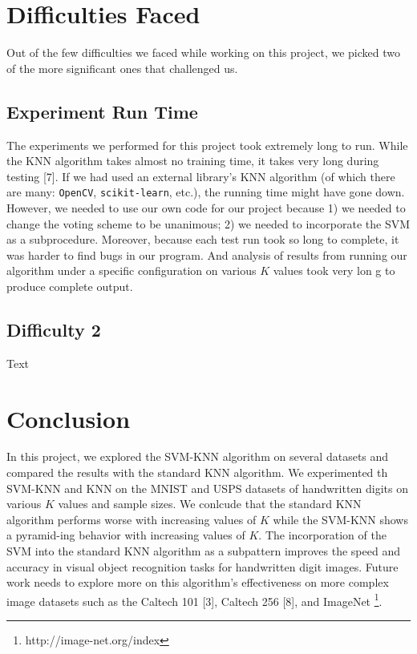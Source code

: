 \documentclass[11pt,letterpaper]{article}
\begin{document}
\section{Difficulties Faced}

Out of the few difficulties we faced while working on this project, we picked two of the more significant ones that challenged us.

\subsection{Experiment Run Time}

The experiments we performed for this project took extremely long to run. While the KNN algorithm takes almost no training time, it takes very long during testing [7]. If we had used an external library's KNN algorithm (of which there are many: {\tt OpenCV}, {\tt scikit-learn}, etc.), the running time might have gone down. However, we needed to use our own code for our project because 1) we needed to change the voting scheme to be unanimous; 2) we needed to incorporate the SVM as a subprocedure. Moreover, because each test run took so long to complete, it was harder to find bugs in our program. And analysis of results from running our algorithm under a specific configuration on various $K$ values took very lon g to produce complete output.

\subsection{Difficulty 2}

Text


\section{Conclusion}

In this project, we explored the SVM-KNN algorithm on several datasets and compared the results with the standard KNN algorithm. We experimented th SVM-KNN and KNN on the MNIST and USPS datasets of handwritten digits on various $K$ values and sample sizes. We conlcude that the standard KNN algorithm performs worse with increasing values of $K$ while the SVM-KNN shows a pyramid-ing behavior with increasing values of $K$. The incorporation of the SVM into the standard KNN algorithm as a subpattern improves the speed and accuracy in visual object recognition tasks for handwritten digit images. Future work needs to explore more on this algorithm's effectiveness on more complex image datasets such as the Caltech 101 [3], Caltech 256 [8], and ImageNet \footnote{http://image-net.org/index}.
\end{document}
